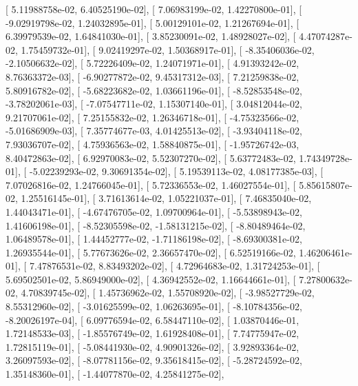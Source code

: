 \documentclass{article}
\begin{document}
       [  5.11988758e-02,   6.40525190e-02],
       [  7.06983199e-02,   1.42270800e-01],
       [ -9.02919798e-02,   1.24032895e-01],
       [  5.00129101e-02,   1.21267694e-01],
       [  6.39979539e-02,   1.64841030e-01],
       [  3.85230091e-02,   1.48928027e-02],
       [  4.47074287e-02,   1.75459732e-01],
       [  9.02419297e-02,   1.50368917e-01],
       [ -8.35406036e-02,  -2.10506632e-02],
       [  5.72226409e-02,   1.24071971e-01],
       [  4.91393242e-02,   8.76363372e-03],
       [ -6.90277872e-02,   9.45317312e-03],
       [  7.21259838e-02,   5.80916782e-02],
       [ -5.68223682e-02,   1.03661196e-01],
       [ -8.52853548e-02,  -3.78202061e-03],
       [ -7.07547711e-02,   1.15307140e-01],
       [  3.04812044e-02,   9.21707061e-02],
       [  7.25155832e-02,   1.26346718e-01],
       [ -4.75323566e-02,  -5.01686909e-03],
       [  7.35774677e-03,   4.01425513e-02],
       [ -3.93404118e-02,   7.93036707e-02],
       [  4.75936563e-02,   1.58840875e-01],
       [ -1.95726742e-03,   8.40472863e-02],
       [  6.92970083e-02,   5.52307270e-02],
       [  5.63772483e-02,   1.74349728e-01],
       [ -5.02239293e-02,   9.30691354e-02],
       [  5.19539113e-02,   4.08177385e-03],
       [  7.07026816e-02,   1.24766045e-01],
       [  5.72336553e-02,   1.46027554e-01],
       [  5.85615807e-02,   1.25516145e-01],
       [  3.71613614e-02,   1.05221037e-01],
       [  7.46835040e-02,   1.44043471e-01],
       [ -4.67476705e-02,   1.09700964e-01],
       [ -5.53898943e-02,   1.41606198e-01],
       [ -8.52305598e-02,  -1.58131215e-02],
       [ -8.80489464e-02,   1.06489578e-01],
       [  1.44452777e-02,  -1.71186198e-02],
       [ -8.69300381e-02,   1.26935544e-01],
       [  5.77673626e-02,   2.36657470e-02],
       [  6.52519166e-02,   1.46206461e-01],
       [  7.47876531e-02,   8.83493202e-02],
       [  4.72964683e-02,   1.31724253e-01],
       [  5.69502501e-02,   5.86949000e-02],
       [  4.36942552e-02,   1.16644661e-01],
       [  7.27800632e-02,   4.70839745e-02],
       [  1.45736962e-02,   1.55708920e-02],
       [ -3.98527729e-02,   8.55312960e-02],
       [ -3.01625599e-02,   1.06263695e-01],
       [ -8.10784356e-02,  -8.20026197e-04],
       [  6.09776594e-02,   6.58447110e-02],
       [  1.03870446e-01,   1.72148533e-03],
       [ -1.85576749e-02,   1.61928408e-01],
       [  7.74775947e-02,   1.72815119e-01],
       [ -5.08441930e-02,   4.90901326e-02],
       [  3.92893364e-02,   3.26097593e-02],
       [ -8.07781156e-02,   9.35618415e-02],
       [ -5.28724592e-02,   1.35148360e-01],
       [ -1.44077870e-02,   4.25841275e-02],
\end{document}
